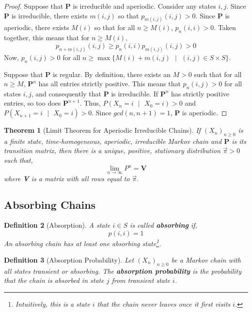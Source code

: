 \documentclass{tufte-handout}
\newtheorem{thm}{Theorem}
\newtheorem{defn}[thm]{Definition}
\begin{document}
  \begin{proof}
    Suppose that $\boldsymbol{P}$ is irreducible and aperiodic. Consider any states $i,j$. Since $\boldsymbol{P}$ is irreducible, there exists $m(i,j)$ so that $p_{m(i,j)}(i,j) > 0$. Since $\boldsymbol{P}$ is aperiodic, there exists $M(i)$ so that for all $n \geq M(i)$, $p_n(i,i) > 0$. Taken together, this means that for $n \geq M(i)$,
    \[p_{n+m(i,j)}(i,j) \geq p_n(i,i)p_{m(i,j)}(i,j) > 0\]
    \noindent Now, $p_n(i,j) > 0$ for all $n \geq \max \{M(i) + m(i,j) \text{ $|$ } (i,j) \in S \times S\}$.

    Suppose that $\boldsymbol{P}$ is regular. By definition, there exists an $M > 0$ such that for all $n \geq M$, $\boldsymbol{P}^n$ has all entries strictly positive. This means that $p_n(i,j) > 0$ for all states $i,j$, and consequently that $\boldsymbol{P}$ is irreducible. If $\boldsymbol{P}^n$ has strictly positive entries, so too does $\boldsymbol{P}^{n+1}$. Thus, $P(X_n = i \text{ $|$ } X_0 = i) > 0$ and $P(X_{n+1} = i \text{ $|$ } X_0 = i) > 0$. Since $gcd(n, n+1) = 1$, $\boldsymbol{P}$ is aperiodic. 
  \end{proof}

  
  \begin{thm}[Limit Theorem for Aperiodic Irreducible Chains]
    If $(X_n)_{n \geq 0}$ is a finite state, time-homogeneous, aperiodic, irreducible Markov chain and $\boldsymbol{P}$ is its transition matrix, then there is a unique, positive, stationary distribution $\Vec{\pi} > 0$ such that,
    \[ \lim_{n \rightarrow \infty} P^n = \boldsymbol{V}\]
    \noindent where \textbf{V} is a matrix with all rows equal to $\Vec{\pi}.$
  \end{thm}

  \subsection{Absorbing Chains}
  \begin{defn}[Absorption]
    A state $i \in S$ is called \textbf{absorbing} if,
    \[p(i, i) = 1\]
    An absorbing chain has at least one absorbing state\footnote{Intuitively, this is a state $i$ that the chain never leaves once it first visits $i$.}.
  \end{defn}

  \begin{defn}[Absorption Probability]
    Let $(X_n)_{n \geq 0}$ be a Markov chain with all states transient or absorbing. The \textbf{absorption probability} is the probability that the chain is absorbed in state $j$ from transient state $i$. 
  \end{defn}
\end{document}
